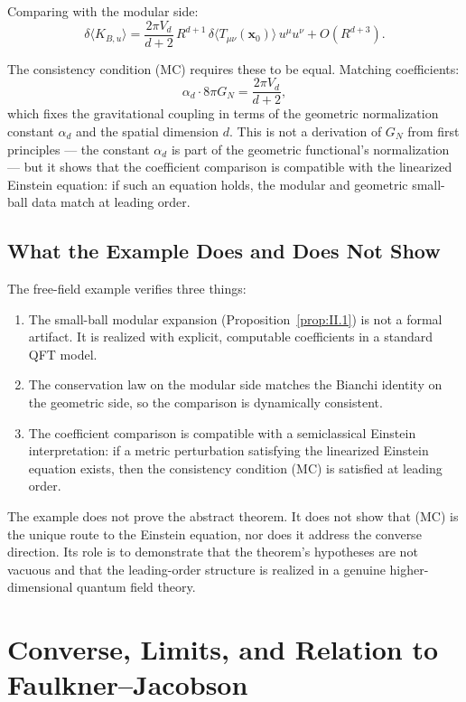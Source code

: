 \documentclass[12pt]{article}
\theoremstyle{definition}
\theoremstyle{remark}
\begin{document}
Comparing with the modular side:
\[
\delta\langle K_{B,u}\rangle
=
\frac{2\pi V_d}{d+2}\,R^{d+1}\,\delta\langle T_{\mu\nu}(\mathbf{x}_0)\rangle\,u^\mu u^\nu
+
O(R^{d+3}).
\]

The consistency condition (MC) requires these to be equal. Matching coefficients:
\[
\alpha_d\cdot 8\pi G_N = \frac{2\pi V_d}{d+2},
\]
which fixes the gravitational coupling in terms of the geometric normalization constant \(\alpha_d\) and the spatial dimension \(d\). This is not a derivation of \(G_N\) from first principles --- the constant \(\alpha_d\) is part of the geometric functional's normalization --- but it shows that the coefficient comparison is compatible with the linearized Einstein equation: if such an equation holds, the modular and geometric small-ball data match at leading order.

\subsection{What the Example Does and Does Not Show}\label{subsec:5.7}

The free-field example verifies three things:
\begin{enumerate}
\item The small-ball modular expansion (Proposition~\ref{prop:II.1}) is not a formal artifact. It is realized with explicit, computable coefficients in a standard QFT model.
\item The conservation law on the modular side matches the Bianchi identity on the geometric side, so the comparison is dynamically consistent.
\item The coefficient comparison is compatible with a semiclassical Einstein interpretation: if a metric perturbation satisfying the linearized Einstein equation exists, then the consistency condition (MC) is satisfied at leading order.
\end{enumerate}

The example does not prove the abstract theorem. It does not show that (MC) is the unique route to the Einstein equation, nor does it address the converse direction. Its role is to demonstrate that the theorem's hypotheses are not vacuous and that the leading-order structure is realized in a genuine higher-dimensional quantum field theory.

\section{Converse, Limits, and Relation to Faulkner--Jacobson}\label{sec:6}
\end{document}
